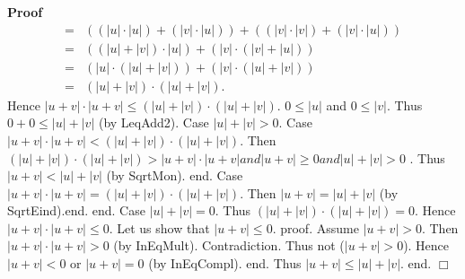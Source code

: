 \documentclass{article}
\newenvironment{forthel}{\begin{leftbar}}{\end{leftbar}}
\newenvironment{proof}{\noindent\textbf{Proof\ }}{\hspace*{\fill}$\Box$\medskip}
\newcommand{\cadd}{+}
\begin{document}
\begin{forthel}
\begin{proof}
\begin{align*}
= &((|u| \cdot |u|) + (|v| \cdot |u|)) + ((|v| \cdot |v|) + (|v| \cdot |u|))\\
= &((|u| + |v|)  \cdot  |u|) + (|v| \cdot (|v|+|u|))\\
= &(|u|  \cdot  (|u| + |v|)) + (|v|  \cdot  (|u| + |v|))\\
= &(|u| + |v|) \cdot (|u| + |v|).
\end{align*}
Hence $|u  \cadd  v| \cdot |u  \cadd  v|  \leq  (|u| + |v|) \cdot (|u| + |v|)$.\newline
$0  \leq  |u|$ and $0  \leq  |v|$. Thus $0 + 0  \leq  |u| + |v|$ (by LeqAdd2).\newline\newline
	Case $|u| + |v|  >  0$. \newline\newline
Case $|u  \cadd  v| \cdot |u  \cadd  v|  <  (|u| + |v|) \cdot (|u| + |v|)$. \newline
Then $(|u| + |v|) \cdot (|u| + |v|)  >  |u  \cadd  v| \cdot |u  \cadd  v| and |u  \cadd  v|  \geq  0 and |u| + |v|  >  0$ .\newline
Thus $|u  \cadd  v|  <  |u| + |v|$ (by SqrtMon). end.\newline
Case $|u  \cadd  v| \cdot |u  \cadd  v| = (|u| + |v|) \cdot (|u| + |v|)$.\newline
Then $|u  \cadd  v| = |u| + |v|$ (by SqrtEind).end.\newline
end.\newline\newline
	Case $|u| + |v| = 0$. \newline\newline
Thus $(|u| + |v|) \cdot (|u| + |v|) = 0$. Hence $|u  \cadd  v| \cdot |u  \cadd  v|  \leq  0$. \newline 
Let us show that $|u  \cadd  v|  \leq  0$. \newline
proof. 	Assume $|u  \cadd  v|  >  0$. 
Then $|u  \cadd  v| \cdot |u  \cadd  v|  >  0$ (by InEqMult). Contradiction.\newline
Thus not ($|u  \cadd  v|  >  0$). Hence $|u  \cadd  v|  <  0$ or $|u  \cadd  v| = 0$ (by InEqCompl). \newline
end.\newline
Thus $|u  \cadd  v|  \leq  |u| + |v|$.\newline
end.\newline
\end{proof}

\end{forthel}
\end{document}
